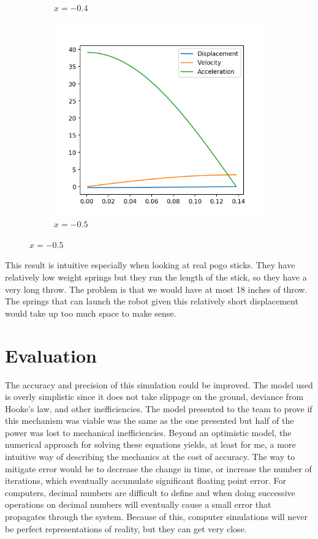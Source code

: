 \documentclass[12pt, letterpaper]{article}
\begin{document}
\begin{figure}[h]
\begin{subfigure}[b]{.3\linewidth}
    \caption{$x=-0.4$}
  \end{subfigure}
  \begin{subfigure}[b]{.3\linewidth}
    \includegraphics[width=\linewidth]{Hooke/hooke9000-0_3.png}
    \caption{$x=-0.5$}
  \end{subfigure}
\end{figure}

This result is intuitive especially when looking at real pogo sticks. They have relatively low weight springs
but they run the length of the stick, so they have a very long throw. The problem is that we would have at
most 18 inches of throw. The springs that can launch the robot given this relatively short displacement would
take up too much space to make sense.

\section{Evaluation}
The accuracy and precision of this simulation could be improved. The model used is overly simplistic
since it does not take slippage on the ground, deviance from Hooke's law, and other inefficiencies. The model
presented to the team to prove if this mechanism was viable was the same as the one presented but half of the
power was lost to mechanical inefficiencies. Beyond an optimistic model, the numerical approach for solving
these equations yields, at least for me, a more intuitive way of describing the mechanics at the cost of
accuracy. The way to mitigate error would be to decrease the change in time, or increase the number of
iterations, which eventually accumulate significant floating point error. For computers, decimal numbers are
difficult to define and when doing successive operations on decimal numbers will eventually cause a small
error that propagates through the system. Because of this, computer simulations will never be perfect
representations of reality, but they can get very close.
\end{document}
